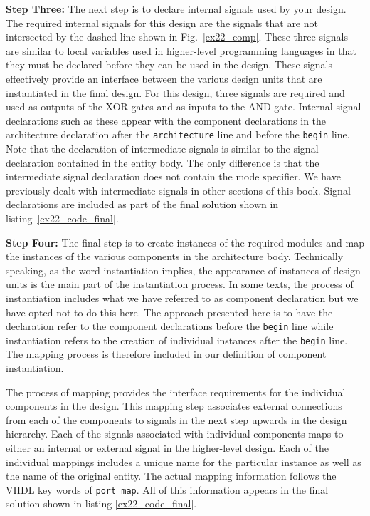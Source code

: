 \noindent
\textbf{Step Three:} The next step is to declare internal signals used by your design. The required internal signals for this design are the signals that are not intersected by the dashed line shown in Fig.~\ref{ex22_comp}. These three signals are similar to local variables used in higher-level programming languages in that they must be declared before they can be used in the design. These signals effectively provide an interface between the various design units that are instantiated in the final design. For this design, three signals are required and used as outputs of the XOR gates and as inputs to the AND gate. Internal signal declarations such as these appear with the component declarations in the architecture declaration after the  \texttt{architecture} line and before the  \texttt{begin} line. Note that the declaration of intermediate signals is similar to the signal declaration contained in the entity body. The only difference is that the intermediate signal declaration does not contain the mode specifier. We have previously dealt with intermediate signals in other sections of this book. Signal declarations are included as part of the final solution shown in listing~\ref{ex22_code_final}.

\noindent
\textbf{Step Four:} The final step is to create instances of the required modules and map the instances of the various components in the architecture body. Technically speaking, as the word instantiation implies, the appearance of instances of design units is the main part of the instantiation process. In some texts, the process of instantiation includes what we have referred to as component declaration but we have opted not to do this here. The approach presented here is to have the declaration refer to the component declarations before the \texttt{begin} line while instantiation refers to the creation of individual instances after the \texttt{begin} line. The mapping process is therefore included in our definition of component instantiation.

The process of mapping provides the interface requirements for the individual components in the design. This mapping step associates external connections from each of the components to signals in the next step upwards in the design hierarchy. Each of the signals associated with individual components maps to either an internal or external signal in the higher-level design. Each of the individual mappings includes a unique name for the particular instance as well as the name of the original entity. The actual mapping information follows the VHDL key words of \texttt{port map}. All of this information appears in the final solution shown in listing \ref{ex22_code_final}.

